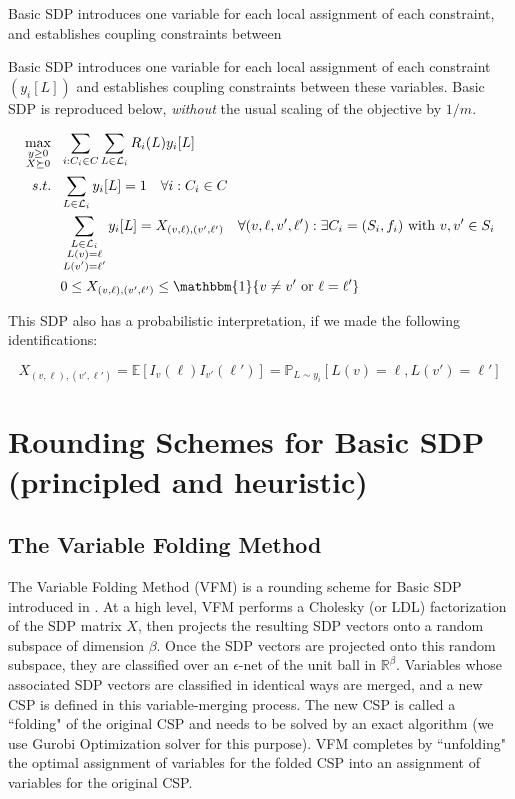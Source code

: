 \documentclass[12pt]{article} %
\begin{document}
Basic SDP introduces one variable for each local assignment of each constraint, and establishes coupling constraints between 

Basic SDP introduces one variable for each local assignment of each constraint $(y_i[L])$ and establishes coupling constraints between these variables. Basic SDP \cite{raghavendra2008optimal} is reproduced below, \emph{without} the usual scaling of the objective by $1/m$.

\begin{align}
\operatorname*{max}_{\substack{y \geq 0 \\  X \succeq 0}} ~ & ~ \sum\limits_{i:C_i\in C} \sum\limits_{L\in \mathcal{L}_i} R_i(L)y_i[L] \nonumber  \\
s.t. ~ & ~ \sum\limits_{L \in \mathcal{L}_i} y_i[L] = 1  \quad \forall i : C_i \in C \\
& ~ \sum\limits_{\substack{L \in \mathcal{L}_i \\ L(v)=\ell \\ L(v')=\ell '}} y_i[L] = X_{(v,\ell),(v',\ell')}  \quad \forall (v,\ell,v',\ell') : \exists C_i = (S_i, f_i) \text{ with } v,v' \in S_i \\
& ~ 0 \leq  X_{(v,\ell),(v',\ell')}  \leq \mathbbm{1}\{ v \neq v' \text{ or } \ell = \ell' \}
\end{align}

This SDP also has a probabilistic interpretation, if we made the following identifications:

\begin{equation}
X_{(v,\ell),(v',\ell')} = \mathbb{E}[I_v(\ell)I_{v'}(\ell')] = \mathbb{P}_{L\sim y_i}[L(v)=\ell, L(v')=\ell']
\end{equation}

\section{Rounding Schemes for Basic SDP (principled and heuristic)}


\subsection{The Variable Folding Method}

The Variable Folding Method (VFM) is a rounding scheme for Basic SDP introduced in \citet{raghavendra2009round}. At a high level, VFM performs a Cholesky (or LDL) factorization of the SDP matrix $X$, then projects the resulting SDP vectors onto a random subspace of dimension $\beta$. Once the SDP vectors are projected onto this random subspace, they are classified over an $\epsilon$-net of the unit ball in $\mathbb{R}^\beta$. Variables whose associated SDP vectors are classified in identical ways are merged, and a new CSP is defined in this variable-merging process. The new CSP is called a ``folding" of the original CSP and needs to be solved by an exact algorithm (we use Gurobi Optimization solver for this purpose). VFM completes by ``unfolding" the optimal assignment of variables for the folded CSP into an assignment of variables for the original CSP.
\end{document}
